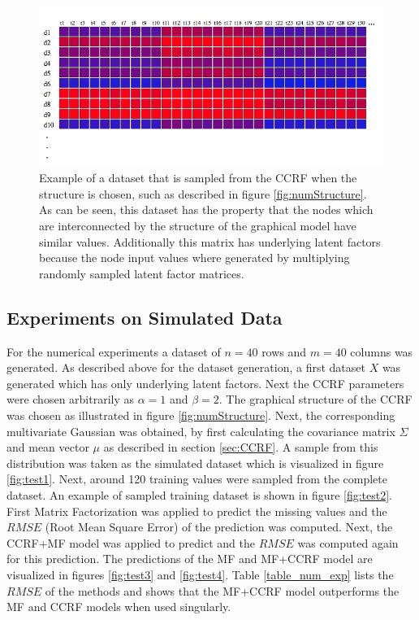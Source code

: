 \begin{figure}
\begin{center}
\includegraphics[scale=0.5]{numeric_sample.png}
\end{center}
\caption[Example of CCRF sample]{Example of a dataset that is sampled from the CCRF when the structure is chosen, such as described in figure \ref{fig:numStructure}. As can be seen, this dataset has the property that the nodes which are interconnected by the structure of the graphical model have similar values. Additionally this matrix has underlying latent factors because the node input values where generated by multiplying randomly sampled latent factor matrices. }
\label{fig:numSample}
\end{figure}

\subsection{Experiments on Simulated Data}

For the numerical experiments a dataset of $n=40$ rows and $m=40$ columns was generated. As described above for the dataset generation, a first dataset $X$ was generated which has only underlying latent factors. Next the CCRF parameters were chosen arbitrarily as $\alpha=1$ and $\beta=2$. The graphical structure of the CCRF was chosen as illustrated in figure \ref{fig:numStructure}. Next, the corresponding multivariate Gaussian was obtained, by first calculating the covariance matrix $\Sigma$ and mean vector $\mu$ as described in section \ref{sec:CCRF}. A sample from this distribution was taken as the simulated dataset which is visualized in figure \ref{fig:test1}. Next, around 120 training values were sampled from the complete dataset. An example of sampled training dataset is shown in figure \ref{fig:test2}. First Matrix Factorization was applied to predict the missing values and the $RMSE$ (Root Mean Square Error) of the prediction was computed. Next, the CCRF+MF model was applied to predict and the $RMSE$ was computed again for this prediction. The predictions of the MF and MF+CCRF model are visualized in figures \ref{fig:test3} and \ref{fig:test4}. Table \ref{table_num_exp} lists the $RMSE$ of the methods and shows that the MF+CCRF model outperforms the MF and CCRF models when used singularly.


